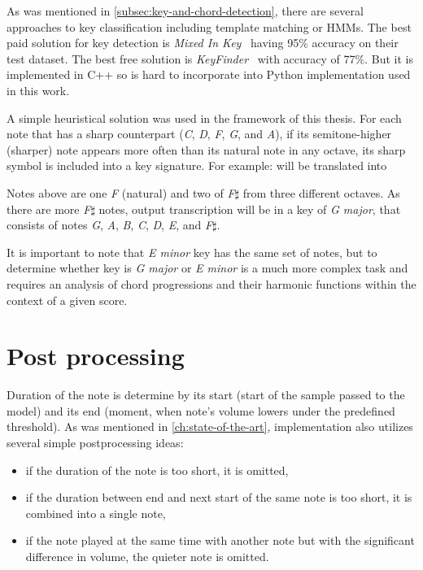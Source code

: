As was mentioned in \cref{subsec:key-and-chord-detection}, there are several approaches to key classification including
template matching or \acp{HMM}. The best paid solution for key detection is \textit{Mixed In Key}~\cite{mixed-in-keys}
having 95\% accuracy on their test dataset. The best free solution is \textit{KeyFinder}~\cite{key-finder} with accuracy
of 77\%. But it is implemented in C++ so is hard to incorporate into Python implementation used in this work.

A simple heuristical solution was used in the framework of this thesis. For each note that has a sharp counterpart
(\textit{C}, \textit{D}, \textit{F}, \textit{G}, and \textit{A}), if its semitone-higher (sharper) note appears more
often than its natural note in any octave, its sharp symbol is included into a key signature. For example:
will be translated into

Notes above are one \textit{F} (natural) and two of \textit{F}$\sharp$ from three different octaves. As there are more
\textit{F}$\sharp$ notes, output transcription will be in a key of \textit{G major}, that consists of notes \textit{G},
\textit{A}, \textit{B}, \textit{C}, \textit{D}, \textit{E}, and \textit{F}$\sharp$.

It is important to note that \textit{E minor} key has the same set of notes, but to determine whether key is
\textit{G major} or \textit{E minor} is a much more complex task and requires an analysis of chord progressions and
their harmonic functions within the context of a given score.

\section{Post processing}\label{sec:post-processing}

Duration of the note is determine by its start (start of the sample passed to the model) and its end (moment, when
note's volume lowers under the predefined threshold). As was mentioned in \cref{ch:state-of-the-art}, implementation
also utilizes several simple postprocessing ideas:
\begin{itemize}
	\item if the duration of the note is too short, it is omitted,
	\item if the duration between end and next start of the same note is too short, it is combined into a single note,
	\item if the note played at the same time with another note but with the significant difference in volume,
	the quieter note is omitted.
\end{itemize}

